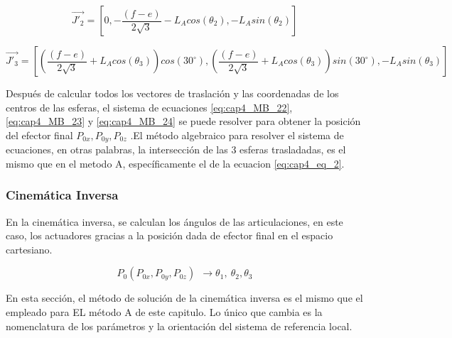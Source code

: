         \begin{equation}
                \overrightarrow{J'_{2}}= \left [  0,-\frac{(f-e)}{2\sqrt{3}}-L_{A}cos(\theta_2),-L_{A}sin(\theta_2)\right]
        \label{eq:cap4_MB_4}
        \end{equation}    
        
        \begin{equation}
                \overrightarrow{J'_{3}}= \left [\left( \frac{(f-e)}{2\sqrt{3}}+{L}_{A}cos(\theta_3)\right) cos(30^\circ), \left(\frac{(f-e)}{2\sqrt{3}} + {L}_{A}cos(\theta_3)\right) sin(30^\circ), -L_{A}sin(\theta_3)\right]
        \label{eq:cap4_MB_5}
        \end{equation}    
  
      Después de calcular todos los vectores de traslación y las coordenadas de los centros de las esferas, el sistema de ecuaciones  \ref{eq:cap4_MB_22}, \ref{eq:cap4_MB_23} y \ref{eq:cap4_MB_24} se puede resolver para obtener la posición del efector final \( P_{0x},P_{0y},P_{0z} \) .El método algebraico para resolver el sistema de ecuaciones, en otras palabras, la intersección de las 3 esferas trasladadas, es el mismo que en el metodo A, específicamente el de la ecuacion \ref{eq:cap4_eq_2}.
  
 \newpage
        
        

\subsubsection{Cinemática Inversa}\label{mb_ci}

      En la cinemática inversa, se calculan los ángulos de las articulaciones, en este caso, los actuadores gracias a la posición dada de efector final en el espacio cartesiano. 
      
        \begin{equation}
              P_{0} \left( P_{0x},P_{0y},P_{0z} \right) ~~ \rightarrow    \theta _{1},~ \theta _{2}, \theta _{3} 
        \label{eq:cap4_MB_6}
        \end{equation}\par      
      
     En esta sección, el método de solución de la cinemática inversa es el mismo que el empleado para EL método A de este capitulo. Lo único que cambia es la nomenclatura de los parámetros y la orientación del sistema de referencia local.
  
